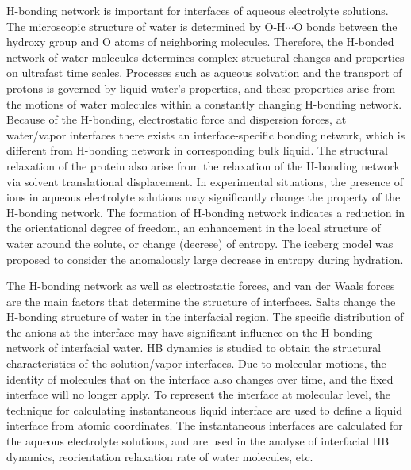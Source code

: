 H-bonding network is important for interfaces of aqueous electrolyte solutions.
The microscopic structure of water is determined by O-H$\cdots$O bonds between the hydroxy group 
and O atoms of neighboring molecules. Therefore, the H-bonded network of water molecules determines complex structural changes 
and properties on ultrafast time scales.\cite{Stenger01, Jimenez1994,Chowdhuri2002}
Processes such as aqueous solvation and the transport of protons is governed by liquid water's properties, 
and these properties arise from the motions of water molecules within a constantly changing H-bonding network.\cite{CJF03}
Because of the H-bonding, electrostatic force and dispersion forces, 
at water/vapor interfaces there exists an interface-specific bonding network, 
which is different from H-bonding network in corresponding bulk liquid.\cite{Allongue96,Velasco-Velez14}
The structural relaxation of the protein also arise from the relaxation of the H-bonding network 
via solvent translational displacement.\cite{Tarek02} In experimental situations, the presence of ions in aqueous 
electrolyte solutions may significantly change the property of the H-bonding network. 
The formation of H-bonding network indicates a reduction in the orientational degree of freedom, 
an enhancement in the local structure of water around the solute, or change (decrese) of entropy.\cite{Frank45a, Frank45b,Frank45c}
The iceberg model was proposed to consider the anomalously large decrease in entropy during hydration.\cite{Frank45c}

%
The H-bonding network \cite{Eisenberg1969,Speedy1976,Poole1994,Soper2008b,Nilsson2011,Ball2001,Pettersson2015} as well as electrostatic forces, 
and van der Waals forces are the main factors that determine the structure of interfaces. 
Salts change the H-bonding structure of water in the interfacial region\cite{EAR04,McLain2006,Ball2008}. 
The specific distribution of the anions at the interface may have significant influence on the H-bonding network of interfacial water\cite{Morita2008}.
HB dynamics is studied to obtain the structural characteristics of the solution/vapor interfaces.
Due to molecular motions, the identity of molecules that on the interface also changes over time\cite{Willard2010}, and the fixed interface will no longer apply. 
To represent the interface at molecular level, the technique for calculating instantaneous liquid interface are used to define a liquid interface from atomic coordinates.
The instantaneous interfaces are calculated for the aqueous electrolyte solutions, and are used in the analyse of interfacial HB dynamics, 
reorientation relaxation rate of water molecules, etc.

